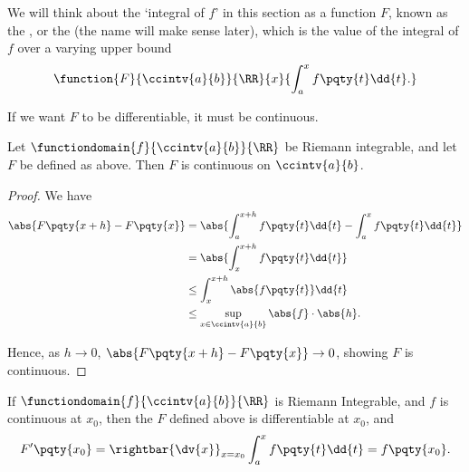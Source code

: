We will think about the `integral of \(f\)' in this section as a function \(F\), known as the , or the  (the name will make sense later), which is the value of the integral of \(f\) over a varying upper bound
\[
    \function{F}{\ccintv{a}{b}}{\RR}{x}{\int_{a}^{x} f\pqty{t} \dd{t}.}
\]

If we want \(F\) to be differentiable, it must be continuous.

\begin{proposition}
    \label{prop:indef-integral-continuous}%
    Let \(\functiondomain{f}{\ccintv{a}{b}}{\RR}\) be Riemann integrable, and let \(F\) be defined as above. Then \(F\) is continuous on \(\ccintv{a}{b}\).
\end{proposition}

\begin{proof}
    We have
    \begin{align*}
        \abs{F\pqty{x + h} - F\pqty{x}} &= \abs{\int_{a}^{x + h} f\pqty{t} \dd{t} - \int_{a}^{x} f\pqty{t} \dd{t}} \\
        &= \abs{\int_{x}^{x + h} f\pqty{t} \dd{t}} \\
        &\leq \int_{x}^{x + h} \abs{f\pqty{t}} \dd{t} \\
        &\leq \sup_{x \in \ccintv{a}{b}} \abs{f} \cdot \abs{h}.
    \end{align*}

    Hence, as \(h \to 0\), \(\abs{F\pqty{x + h} - F\pqty{x}} \to 0\), showing \(F\) is continuous.
\end{proof}

\begin{theorem}
    \label{thm:ftc-1}%
    If \(\functiondomain{f}{\ccintv{a}{b}}{\RR}\) is Riemann Integrable, and \(f\) is continuous at \(x_0\), then the \(F\) defined above is differentiable at \(x_0\), and
    \[
        F'\pqty{x_0} = \rightbar{\dv{x}}_{x = x_0} \int_{a}^{x} f\pqty{t} \dd{t} = f\pqty{x_0}.
    \]
\end{theorem}

